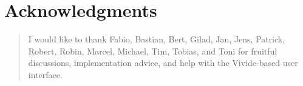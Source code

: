 \begingroup
\let\raggedsection\centering

\chapter*{Acknowledgments}
\label{cha:acknowledgments}
\endgroup
\begin{quotation}
\noindent
I would like to thank Fabio, Bastian, Bert, Gilad, Jan, Jens, Patrick, Robert, Robin, Marcel, Michael, Tim, Tobias, and Toni for fruitful discussions, implementation advice, and help with the Vivide-based user interface.
\end{quotation}
